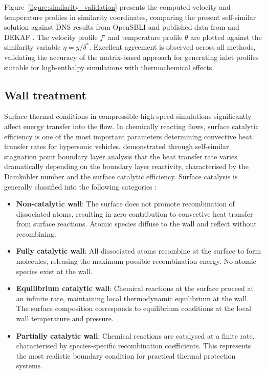 Figure~\ref{figure:similarity_validation} presents the computed velocity and temperature profiles in similarity coordinates, comparing the present self-similar solution against DNS results from OpenSBLI and published data from \citet{PassiatoreEtAl2023} and DEKAF \citep{MiroMiroetal2020}. The velocity profile $f'$ and temperature profile $\theta$ are plotted against the similarity variable $\eta = y/\delta^*$. Excellent agreement is observed across all methods, validating the accuracy of the matrix-based approach for generating inlet profiles suitable for high-enthalpy simulations with thermochemical effects.


\subsection{Wall treatment}

Surface thermal conditions in compressible high-speed simulations significantly affect energy transfer into the flow. In chemically reacting flows, surface catalytic efficiency is one of the most important parameters determining convective heat transfer rates for hypersonic vehicles. \citet{FayRiddell1958} demonstrated through self-similar stagnation point boundary layer analysis that the heat transfer rate varies dramatically depending on the boundary layer reactivity, characterised by the Damköhler number and the surface catalytic efficiency. Surface catalysis is generally classified into the following categories \citep{Anderson2019}:

\begin{itemize}
    \item \textbf{Non-catalytic wall}: The surface does not promote recombination of dissociated atoms, resulting in zero contribution to convective heat transfer from surface reactions. Atomic species diffuse to the wall and reflect without recombining.
    
    \item \textbf{Fully catalytic wall}: All dissociated atoms recombine at the surface to form molecules, releasing the maximum possible recombination energy. No atomic species exist at the wall.
    
    \item \textbf{Equilibrium catalytic wall}: Chemical reactions at the surface proceed at an infinite rate, maintaining local thermodynamic equilibrium at the wall. The surface composition corresponds to equilibrium conditions at the local wall temperature and pressure.
    
    \item \textbf{Partially catalytic wall}: Chemical reactions are catalysed at a finite rate, characterised by species-specific recombination coefficients. This represents the most realistic boundary condition for practical thermal protection systems.
\end{itemize}


